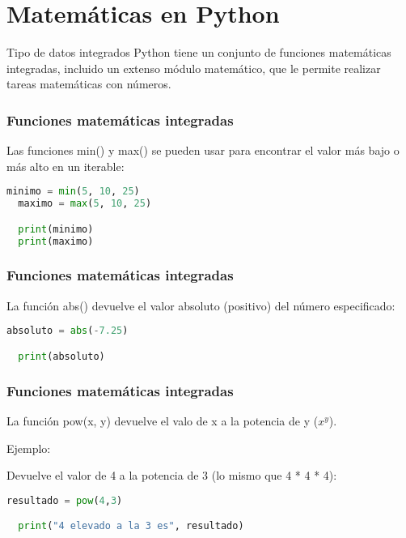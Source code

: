 \section{Matemáticas en Python}

\begin{frame}[c]{Tipo de datos integrados}
  Python tiene un conjunto de funciones matemáticas integradas,
  incluido un extenso módulo matemático, que le permite realizar
  tareas matemáticas con números.
\end{frame}

\begin{frame}[fragile]
  \frametitle{Funciones matemáticas integradas}

  Las funciones \textcolor{codeKeyword}{min}() y
  \textcolor{codeKeyword}{max}() se pueden
  usar para encontrar el valor más bajo o más alto en un iterable:

  \begin{lstlisting}[language=Python]
  minimo = min(5, 10, 25)
  maximo = max(5, 10, 25)

  print(minimo)
  print(maximo)
  \end{lstlisting}
\end{frame}

\begin{frame}[fragile]
  \frametitle{Funciones matemáticas integradas}

  La función \textcolor{codeKeyword}{abs}() devuelve el
  valor absoluto (positivo) del número especificado:

  \begin{lstlisting}[language=Python]
  absoluto = abs(-7.25)

  print(absoluto)
  \end{lstlisting}
\end{frame}

\begin{frame}[fragile]
  \frametitle{Funciones matemáticas integradas}

  La función \textcolor{codeKeyword}{pow(x, y)} devuelve el valo
  de x a la potencia de y ($x^y$).

  \vspace{\baselineskip}
  Ejemplo:

  \vspace{\baselineskip}
  Devuelve el valor de 4 a la potencia de 3 (lo mismo que 4 * 4 * 4):
  \begin{lstlisting}[language=Python]
  resultado = pow(4,3)

  print("4 elevado a la 3 es", resultado)
  \end{lstlisting}
\end{frame}

